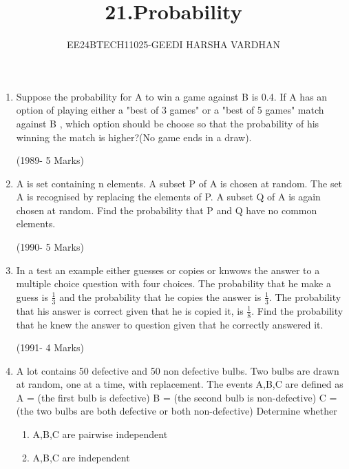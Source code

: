 \documentclass[journal,12pt,twocolumn]{IEEEtran}
\theoremstyle{remark}
\begin{document}

\vspace{3cm}

\title{21.Probability}
\author{EE24BTECH11025-GEEDI HARSHA VARDHAN}
\maketitle
\newpage
\bigskip

\renewcommand{\thefigure}{\theenumi}
\renewcommand{\thetable}{\theenumi}




\begin{enumerate}
\item Suppose the probability for A to win a game against B is 0.4. If A has an option of playing either a "best of 3 games" or a "best of 5 games" match against B , which option should be choose so that the probability of his winning the match is higher?(No game ends in a draw).

\hfill(1989- 5 Marks)

\item A is set containing n elements. A subset P of A is chosen at random. The set A is recognised by replacing the elements of P. A subset Q of A is again chosen at random. Find the probability that P and Q have no common elements.


\hfill(1990- 5 Marks)

\item In a test an example either guesses or copies or knwows the answer to a multiple choice question with four choices. The probability that he make a guess is $\frac{1}{3}$ and the probability that he copies the answer is $\frac{1}{3}$. The probability that his answer is correct given that he is copied it, is $\frac{1}{8}$. Find the probability that he knew the answer to question given that he correctly answered it.

\hfill(1991- 4 Marks)



\item A lot contains 50 defective and 50 non defective bulbs. Two bulbs are drawn at random, one at a time, with replacement. The events A,B,C are defined as 
A = (the first bulb is defective)
B = (the second bulb is non-defective)
C = (the two bulbs are both defective or both non-defective)
Determine whether
\begin{enumerate}[label=(\roman*)]
\item A,B,C are pairwise independent
\item A,B,C are independent
\end{enumerate}


\end{enumerate}
\end{document}
